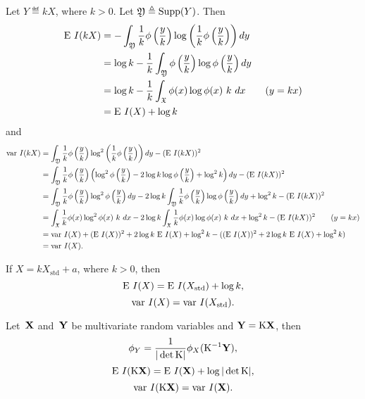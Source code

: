 \documentclass[10pt,a4paper]{article}
\theoremstyle{plain} \newtheorem{Lem}{Lemma}
\begin{document}
Let $Y \eqdef k X$, where $k > 0$.
Let $\mathfrak Y \triangleq \mathrm {Supp}(Y)$.
Then
\begin{equation}
\begin{split}
\mathrm E \  I(kX) &= - \int_{\mathfrak Y} \frac 1 k \phi\left(\frac y k\right) \log \left(\frac 1 k \phi\left(\frac y k\right)\right) dy  \\
      &= \log k - \frac 1 k \int_{\mathfrak Y} \phi\left(\frac y k\right) \log \phi\left(\frac y k\right) dy \\
      &= \log k - \frac 1 k \int_{\mathfrak X} \phi (x) \log \phi (x) \ k \ dx  \qquad (y = kx) \\
      &= \mathrm E \  I(X) + \log k
\end{split}
\end{equation}
and
\begin{equation}
\begin{split}
\mathrm {var} \  I(kX) &= \int_{\mathfrak Y} {\frac 1 k} \phi\left({\frac y k}\right) \log^2 \left({\frac 1 k} \phi\left({\frac y k}\right)\right) dy
              - (\mathrm E \  I(kX))^2 \\
  &= \int_{\mathfrak Y} {\frac 1 k} \phi\left({\frac y k}\right) \left( \log^2 \phi\left({\frac y k}\right) - 2 \log k \log \phi \left({\frac y k}\right) + \log^2 k \right) dy
    - (\mathrm E \  I(kX))^2 \\
  &= \int_{\mathfrak Y} {\frac 1 k} \phi\left({\frac y k}\right) \log^2 \phi\left({\frac y k}\right) dy
     - 2 \log k \int_{\mathfrak Y} {\frac 1 k} \phi\left({\frac y k}\right) \log \phi \left({\frac y k}\right) dy
     + \log^2 k
     - (\mathrm E \  I(kX))^2  \\
  &= \int_{\mathfrak X} {\frac 1 k} \phi (x) \log^2 \phi(x) \ k \ dx
     - 2 \log k \int_{\mathfrak X} {\frac 1 k} \phi(x) \log \phi (x) \ k \ dx
     + \log^2 k
     - (\mathrm E \  I(kX))^2  \qquad (y = kx) \\
  &= \mathrm {var} \  I(X) + (\mathrm E \  I(X))^2
     + 2 \log k \ \mathrm E \  I(X)
     + \log^2 k
     - ((\mathrm E \  I(X))^2 + 2 \log k \ \mathrm E \  I(X) + \log^2 k)  \\
  &= \mathrm {var} \  I(X).
\end{split}
\end{equation}

If $X = k X_{\mathrm {std}} + a$, where $k > 0$,
then
$$\mathrm E \  I(X) = \mathrm E \  I(X_{\mathrm {std}}) + \log k, $$
$$\mathrm {var} \  I(X) = \mathrm {var} \  I(X_{\mathrm {std}}).$$

Let~$\mathbf X$ and~$\mathbf Y$ be multivariate random variables and $\mathbf Y = \mathrm K \mathbf X$,
then $$ \phi_Y = \frac 1 {|\det \mathrm K|} \phi_X (\mathrm K^{-1} \mathbf Y), $$
$$ \mathrm E \  I(\mathrm K \mathbf X) = \mathrm E \  I(\mathbf X) + \log |\det \mathrm K|, $$
$$ \mathrm {var} \  I(\mathrm K \mathbf X) = \mathrm {var} \  I(\mathbf X). $$
\end{document}
